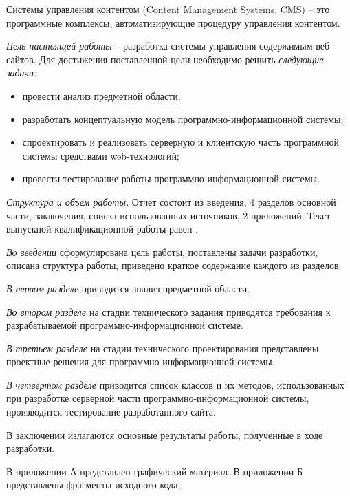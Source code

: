Системы управления контентом (Content Management Systems, CMS) – это программные комплексы, автоматизирующие процедуру управления контентом.

\emph{Цель настоящей работы} – разработка системы управления содержимым веб-сайтов. Для достижения поставленной цели необходимо решить \emph{следующие задачи:}
\begin{itemize}
\item провести анализ предметной области;
\item разработать концептуальную модель программно-информационной системы;
\item спроектировать и реализовать серверную и клиентскую часть программной системы средствами web-технологий;
\item провести тестирование работы программно-информационной системы.
\end{itemize}

\emph{Структура и объем работы.} Отчет состоит из введения, 4 разделов основной части, заключения, списка использованных источников, 2 приложений. Текст выпускной квалификационной работы равен .

\emph{Во введении} сформулирована цель работы, поставлены задачи разработки, описана структура работы, приведено краткое содержание каждого из разделов.

\emph{В первом разделе} приводится анализ предметной области.

\emph{Во втором разделе} на стадии технического задания приводятся требования к разрабатываемой программно-информационной системе.

\emph{В третьем разделе} на стадии технического проектирования представлены проектные решения для программно-информационной системы.

\emph{В четвертом разделе} приводится список классов и их методов, использованных при разработке серверной части программно-информационной системы, производится тестирование разработанного сайта.

В заключении излагаются основные результаты работы, полученные в ходе разработки.

В приложении А представлен графический материал.
В приложении Б представлены фрагменты исходного кода. 
